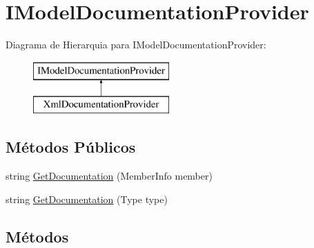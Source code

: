 \hypertarget{interfaceApi3Layers_1_1Areas_1_1HelpPage_1_1ModelDescriptions_1_1IModelDocumentationProvider}{}\section{I\+Model\+Documentation\+Provider}
\label{interfaceApi3Layers_1_1Areas_1_1HelpPage_1_1ModelDescriptions_1_1IModelDocumentationProvider}
Diagrama de Hierarquia para I\+Model\+Documentation\+Provider\+:\begin{figure}[H]
\begin{center}
\leavevmode
\includegraphics[height=2.000000cm]{d1/db0/interfaceApi3Layers_1_1Areas_1_1HelpPage_1_1ModelDescriptions_1_1IModelDocumentationProvider}
\end{center}
\end{figure}
\subsection*{Métodos Públicos}
\begin{DoxyCompactItemize}
\item 
string \hyperlink{interfaceApi3Layers_1_1Areas_1_1HelpPage_1_1ModelDescriptions_1_1IModelDocumentationProvider_aa774bb352a769421583abb335a1cec8a}{Get\+Documentation} (Member\+Info member)
\item 
string \hyperlink{interfaceApi3Layers_1_1Areas_1_1HelpPage_1_1ModelDescriptions_1_1IModelDocumentationProvider_af771cd863288942e506d28447daf4f82}{Get\+Documentation} (Type type)
\end{DoxyCompactItemize}


\subsection{Métodos}
\mbox{\label{interfaceApi3Layers_1_1Areas_1_1HelpPage_1_1ModelDescriptions_1_1IModelDocumentationProvider_aa774bb352a769421583abb335a1cec8a}} 
